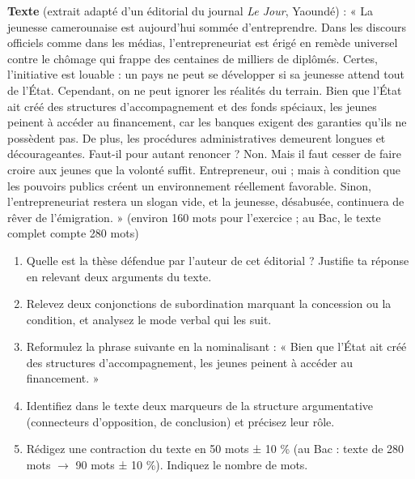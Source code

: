 \documentclass[11pt]{article}
\newcounter{popsec}
\newcounter{popsub}
\newcommand{\courssub}[1]{%
  \stepcounter{popsub}%
  \par\vspace{9pt}\noindent{\popxbold\fontsize{11.5}{13}\selectfont\color{popink}{\color{poporange}\thepopsec.\thepopsub}\hspace{6pt}#1}\par\nopagebreak\vspace{4pt}
}
\begin{document}
\courssub{Je me prépare au Bac}

\begin{exercice}
\textbf{Texte} (extrait adapté d'un éditorial du journal \emph{Le Jour}, Yaoundé) : « La jeunesse camerounaise est aujourd'hui sommée d'entreprendre. Dans les discours officiels comme dans les médias, l'entrepreneuriat est érigé en remède universel contre le chômage qui frappe des centaines de milliers de diplômés. Certes, l'initiative est louable : un pays ne peut se développer si sa jeunesse attend tout de l'État. Cependant, on ne peut ignorer les réalités du terrain. Bien que l'État ait créé des structures d'accompagnement et des fonds spéciaux, les jeunes peinent à accéder au financement, car les banques exigent des garanties qu'ils ne possèdent pas. De plus, les procédures administratives demeurent longues et décourageantes. Faut-il pour autant renoncer ? Non. Mais il faut cesser de faire croire aux jeunes que la volonté suffit. Entrepreneur, oui ; mais à condition que les pouvoirs publics créent un environnement réellement favorable. Sinon, l'entrepreneuriat restera un slogan vide, et la jeunesse, désabusée, continuera de rêver de l'émigration. » (environ 160 mots pour l'exercice ; au Bac, le texte complet compte 280 mots)
\begin{enumerate}
\item Quelle est la thèse défendue par l'auteur de cet éditorial ? Justifie ta réponse en relevant deux arguments du texte.
\item Relevez deux conjonctions de subordination marquant la concession ou la condition, et analysez le mode verbal qui les suit.
\item Reformulez la phrase suivante en la nominalisant : « Bien que l'État ait créé des structures d'accompagnement, les jeunes peinent à accéder au financement. »
\item Identifiez dans le texte deux marqueurs de la structure argumentative (connecteurs d'opposition, de conclusion) et précisez leur rôle.
\item Rédigez une contraction du texte en 50 mots ± 10 \% (au Bac : texte de 280 mots $\rightarrow$ 90 mots ± 10 \%). Indiquez le nombre de mots.
\end{enumerate}
\end{exercice}
\end{document}
